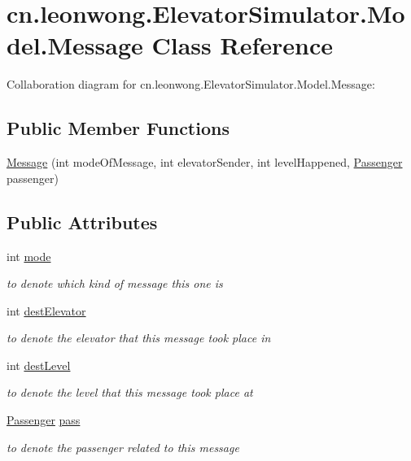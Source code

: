 \hypertarget{classcn_1_1leonwong_1_1_elevator_simulator_1_1_model_1_1_message}{}\section{cn.\+leonwong.\+Elevator\+Simulator.\+Model.\+Message Class Reference}
\label{classcn_1_1leonwong_1_1_elevator_simulator_1_1_model_1_1_message}


Collaboration diagram for cn.\+leonwong.\+Elevator\+Simulator.\+Model.\+Message\+:
\subsection*{Public Member Functions}
\begin{DoxyCompactItemize}
\item 
\hyperlink{classcn_1_1leonwong_1_1_elevator_simulator_1_1_model_1_1_message_a26a9ea8cfcb1d61107a800a5e221ab6c}{Message} (int mode\+Of\+Message, int elevator\+Sender, int level\+Happened, \hyperlink{classcn_1_1leonwong_1_1_elevator_simulator_1_1_model_1_1_passenger}{Passenger} passenger)
\end{DoxyCompactItemize}
\subsection*{Public Attributes}
\begin{DoxyCompactItemize}
\item 
int \hyperlink{classcn_1_1leonwong_1_1_elevator_simulator_1_1_model_1_1_message_a1c8801fa247ef11986bada2b1916e7e9}{mode}
\begin{DoxyCompactList}\small\item\em to denote which kind of message this one is \end{DoxyCompactList}\item 
int \hyperlink{classcn_1_1leonwong_1_1_elevator_simulator_1_1_model_1_1_message_a2f04cd7e8b278e50a64d9c35164e28ff}{dest\+Elevator}
\begin{DoxyCompactList}\small\item\em to denote the elevator that this message took place in \end{DoxyCompactList}\item 
int \hyperlink{classcn_1_1leonwong_1_1_elevator_simulator_1_1_model_1_1_message_a46cbc9bbeaed1cdc3ad481e17a3f13f8}{dest\+Level}
\begin{DoxyCompactList}\small\item\em to denote the level that this message took place at \end{DoxyCompactList}\item 
\hyperlink{classcn_1_1leonwong_1_1_elevator_simulator_1_1_model_1_1_passenger}{Passenger} \hyperlink{classcn_1_1leonwong_1_1_elevator_simulator_1_1_model_1_1_message_ab4f4959e7867933efc65c6279ee36670}{pass}
\begin{DoxyCompactList}\small\item\em to denote the passenger related to this message \end{DoxyCompactList}\end{DoxyCompactItemize}
